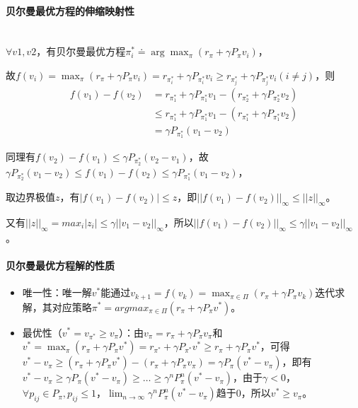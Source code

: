 \documentclass[
12pt, %
a4paper, 
oneside, %
headinclude,footinclude, %
]{scrartcl}
\begin{document}
\paragraph{贝尔曼最优方程的伸缩映射性}~\\

$ \forall v1,v2 $，有贝尔曼最优方程$ \pi_i^* \doteq \arg \max_{\pi}(r_\pi + \gamma P_\pi v_i) $，

故$ f(v_i) = \max_{\pi}(r_\pi + \gamma P_\pi v_i) = r_{\pi_i^*} + \gamma P_{\pi_i^*} v_i \geq r_{\pi_j^*} + \gamma P_{\pi_j^*} v_i (i \neq j) $，则
\begin{align*}
f(v_1) - f(v_2) 
&= r_{\pi_1^*} + \gamma P_{\pi_1^*} v_1 - (r_{\pi_2^*} + \gamma P_{\pi_2^*} v_2) \\
&\leq r_{\pi_1^*} + \gamma P_{\pi_1^*} v_1 - (r_{\pi_1^*} + \gamma P_{\pi_1^*} v_2) \\
&= \gamma P_{\pi_1^*} (v_1 - v_2)
\end{align*}

同理有$ f(v_2) - f(v_1) \leq \gamma P_{\pi_2^*} (v_2 - v_1) $，故$ \gamma P_{\pi_2^*} (v_1 - v_2)\leq f(v_1) - f(v_2) \leq \gamma P_{\pi_1^*} (v_1 - v_2) $，

取边界极值$ z $，有$ |f(v_1) - f(v_2)| \leq z $，即$ ||f(v_1) - f(v_2)||_\infty \leq ||z||_\infty $。

又有$ ||z||_\infty = max_i |z_i| \leq \gamma ||v_1 - v_2||_\infty $，所以$ ||f(v_1) - f(v_2)||_\infty \leq \gamma ||v_1 - v_2||_\infty $。
\paragraph{贝尔曼最优方程解的性质}
\begin{itemize}
\item 唯一性：唯一解$ v^* $能通过$ v_{k + 1} = f(v_k) = \max_{\pi \in \Pi} (r_\pi + \gamma P_\pi v_k) $迭代求解，其对应策略$ \pi^* = argmax_{\pi \in \Pi}(r_\pi + \gamma P_\pi v^*) $。
\item 最优性（$ v^* = v_{\pi^*} \geq v_{\pi} $）：由$ v_{\pi} = r_{\pi} + \gamma P_{\pi} v_{\pi} $和$ v^* = \max_{\pi}(r_{\pi} + \gamma P_{\pi} v^*) = r_{\pi^*} + \gamma P_{\pi^*} v^* \geq r_{\pi} + \gamma P_{\pi} v^* $，可得$ v^* - v_{\pi} \geq (r_{\pi} + \gamma P_{\pi} v^*) - (r_{\pi} + \gamma P_{\pi} v_{\pi}) = \gamma P_{\pi}(v^* - v_{\pi}) $，即有$ v^* - v_{\pi} \geq \gamma P_{\pi}(v^* - v_{\pi}) \geq \dots \geq \gamma^n P_{\pi}^n(v^* - v_{\pi}) $，由于$ \gamma < 0 $，$ \forall p_{ij} \in P_{\pi}, p_{ij} \leq 1 $，$ \lim_{n \to \infty} \gamma^n P_{\pi}^n(v^* - v_{\pi}) $趋于$ 0 $，所以$ v^* \geq v_{\pi} $。
\end{itemize}
\end{document}
